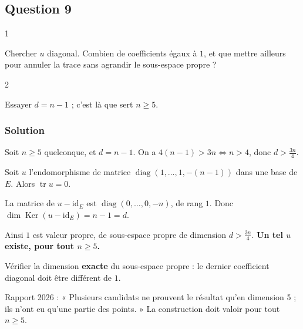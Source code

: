 \documentclass[11pt,a4paper]{article}
\begin{document}
\hypertarget{question-9}{%
\subsection{Question 9}\label{question-9}}

\begin{indication}{1}

Chercher \(u\) diagonal. Combien de coefficients égaux à \(1\), et que mettre ailleurs pour annuler la trace sans agrandir le sous-espace propre ?

\end{indication}

\begin{indication}{2}

Essayer \(d=n-1\) ; c'est là que sert \(n\geqslant5\).

\end{indication}

\hypertarget{solution-8}{%
\subsubsection{Solution}\label{solution-8}}

Soit \(n\geqslant5\) quelconque, et \(d=n-1\). On a \(4(n-1)>3n\iff n>4\), donc \(d>\frac{3n}4\).

Soit \(u\) l'endomorphisme de matrice \(\operatorname{diag}(1,\dots,1,-(n-1))\) dans une base de \(E\). Alors \(\operatorname{tr}u=0\).

La matrice de \(u-{\mathrm{id}}_E\) est \(\operatorname{diag}(0,\dots,0,-n)\), de rang \(1\). Donc \(\dim\operatorname{Ker}(u-{\mathrm{id}}_E)=n-1=d\).

Ainsi \(1\) est valeur propre, de sous-espace propre de dimension \(d>\frac{3n}4\). \textbf{Un tel \(u\) existe, pour tout \(n\geqslant5\).}

\begin{piege}

Vérifier la dimension \textbf{exacte} du sous-espace propre : le dernier coefficient diagonal doit être différent de \(1\).

\end{piege}

\begin{jury}

Rapport 2026 : « Plusieurs candidats ne prouvent le résultat qu'en dimension 5 ; ils n'ont eu qu'une partie des points. » La construction doit valoir pour tout \(n\geqslant5\).

\end{jury}
\end{document}
